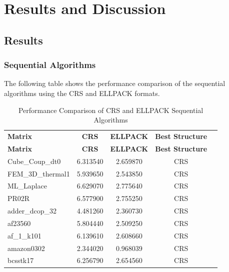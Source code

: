 \documentclass[12pt,oneside]{book} %
\begin{document}
\chapter{Results and Discussion}
\section{Results}

\subsection{Sequential Algorithms}

The following table shows the performance comparison of the sequential
algorithms using the CRS and ELLPACK formats.

\begin{longtable}{lcccr}
    \label{tab:sequential}                                                        \\
    \caption{Performance Comparison of CRS and ELLPACK Sequential Algorithms}     \\
    \toprule
    \textbf{Matrix}   & \textbf{CRS} & \textbf{ELLPACK} & \textbf{Best Structure} \\
    \midrule
    \endfirsthead
    \toprule
    \textbf{Matrix}   & \textbf{CRS} & \textbf{ELLPACK} & \textbf{Best Structure} \\
    \midrule
    \endhead
    \bottomrule
    \endfoot
    Cube\_Coup\_dt0   & 6.313540     & 2.659870         & CRS                     \\
    FEM\_3D\_thermal1 & 5.939650     & 2.543850         & CRS                     \\
    ML\_Laplace       & 6.629070     & 2.775640         & CRS                     \\
    PR02R             & 6.577900     & 2.755250         & CRS                     \\
    adder\_dcop\_32   & 4.481260     & 2.360730         & CRS                     \\
    af23560           & 5.804440     & 2.509250         & CRS                     \\
    af\_1\_k101       & 6.139610     & 2.608660         & CRS                     \\
    amazon0302        & 2.344020     & 0.968039         & CRS                     \\
    bcsstk17          & 6.256790     & 2.654560         & CRS                     \\

\end{longtable}
\end{document}

